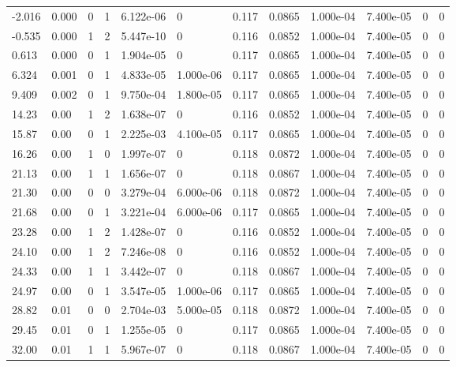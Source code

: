 \documentclass[preview]{standalone}
\begin{document}
{{\begin{tabular}{L{1.2cm}C{1.2cm} C{0.3cm}C{0.5cm} C{1.4cm}C{1.4cm} C{1.4cm}C{1.4cm} C{1.6cm}C{1.6cm} C{1.6cm}C{1.6cm}}
  -2.016  &  0.000  & 0     &  1 &  6.122e-06  & 0  &  0.117&   0.0865& 1.000e-04 & 7.400e-05   &  0 & 0  \\ 
  -0.535  &  0.000  & 1     &  2 &  5.447e-10  & 0  &  0.116&   0.0852& 1.000e-04 & 7.400e-05   &  0 & 0  \\ 
  0.613  &  0.000  & 0     &  1 &  1.904e-05  & 0  &  0.117&   0.0865& 1.000e-04 & 7.400e-05   &  0 & 0  \\ 
  6.324  &  0.001  & 0     &  1 &  4.833e-05  & 1.000e-06  &  0.117&   0.0865& 1.000e-04 & 7.400e-05   &  0 & 0  \\ 
  9.409  &  0.002  & 0     &  1 &  9.750e-04  & 1.800e-05  &  0.117&   0.0865& 1.000e-04 & 7.400e-05   &  0 & 0  \\ 
  14.23  &  0.00  & 1     &  2 &  1.638e-07  & 0  &  0.116&   0.0852& 1.000e-04 & 7.400e-05   &  0 & 0  \\ 
  15.87  &  0.00  & 0     &  1 &  2.225e-03  & 4.100e-05  &  0.117&   0.0865& 1.000e-04 & 7.400e-05   &  0 & 0  \\ 
  16.26  &  0.00  & 1     &  0 &  1.997e-07  & 0  &  0.118&   0.0872& 1.000e-04 & 7.400e-05   &  0 & 0  \\ 
  21.13  &  0.00  & 1     &  1 &  1.656e-07  & 0  &  0.118&   0.0867& 1.000e-04 & 7.400e-05   &  0 & 0  \\ 
  21.30  &  0.00  & 0     &  0 &  3.279e-04  & 6.000e-06  &  0.118&   0.0872& 1.000e-04 & 7.400e-05   &  0 & 0  \\ 
  21.68  &  0.00  & 0     &  1 &  3.221e-04  & 6.000e-06  &  0.117&   0.0865& 1.000e-04 & 7.400e-05   &  0 & 0  \\ 
  23.28  &  0.00  & 1     &  2 &  1.428e-07  & 0  &  0.116&   0.0852& 1.000e-04 & 7.400e-05   &  0 & 0  \\ 
  24.10  &  0.00  & 1     &  2 &  7.246e-08  & 0  &  0.116&   0.0852& 1.000e-04 & 7.400e-05   &  0 & 0  \\ 
  24.33  &  0.00  & 1     &  1 &  3.442e-07  & 0  &  0.118&   0.0867& 1.000e-04 & 7.400e-05   &  0 & 0  \\ 
  24.97  &  0.00  & 0     &  1 &  3.547e-05  & 1.000e-06  &  0.117&   0.0865& 1.000e-04 & 7.400e-05   &  0 & 0  \\ 
  28.82  &  0.01  & 0     &  0 &  2.704e-03  & 5.000e-05  &  0.118&   0.0872& 1.000e-04 & 7.400e-05   &  0 & 0  \\ 
  29.45  &  0.01  & 0     &  1 &  1.255e-05  & 0  &  0.117&   0.0865& 1.000e-04 & 7.400e-05   &  0 & 0  \\ 
  32.00  &  0.01  & 1     &  1 &  5.967e-07  & 0  &  0.118&   0.0867& 1.000e-04 & 7.400e-05   &  0 & 0  \\ 

\end{tabular}}}
\end{document}
